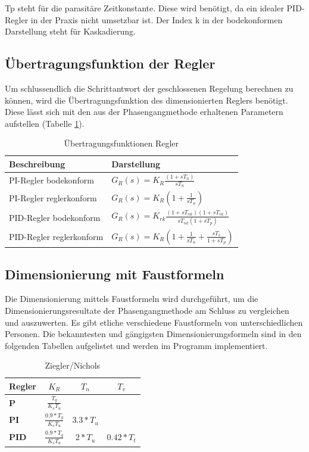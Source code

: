 Tp steht für die parasitäre Zeitkonstante. Diese wird benötigt, da ein idealer PID-Regler in der Praxis nicht umsetzbar ist. Der Index k in der bodekonformen Darstellung steht für Kaskadierung.

\subsection{Übertragungsfunktion der Regler}
Um schlussendlich die Schrittantwort der geschlossenen Regelung berechnen zu können, wird die Übertragungsfunktion des dimensionierten Reglers benötigt. Diese lässt sich mit den aus der Phasengangmethode erhaltenen Parametern aufstellen (Tabelle \ref{ufunkregler}).\newline
\begin{table}
\centering
\renewcommand*{\arraystretch}{1.7}
\begin{tabular}{|l|l|}
\hline 
\textbf{Beschreibung} & \textbf{Darstellung} \\ 
\hline
PI-Regler bodekonform & $G_R(s)=K_R\frac{(1+sT_n)}{sT_n}$ \\ 
\hline 
PI-Regler reglerkonform & $G_R(s)=K_R\left(1+\frac{1}{sT_n}\right)$ \\ 
\hline 
PID-Regler bodekonform & $G_R(s)=K_{rk}\frac{(1+sT_{nk})(1+sT_{vk})}{sT_{nk}(1+sT_p)}$ \\ 
\hline 
PID-Regler reglerkonform & $G_R(s)=K_R\left(1+\frac{1}{sT_n}+\frac{sT_v}{1+sT_p}\right)$ \\ 
\hline 
\end{tabular} 
\renewcommand*{\arraystretch}{1}
\caption{Übertragungsfunktionen Regler}
\label{ufunkregler}
\end{table}

\newpage
\subsection{Dimensionierung mit Faustformeln}
Die Dimensionierung mittels Faustformeln wird durchgeführt, um die Dimensionierungsresultate der Phasengangmethode am Schluss zu vergleichen und auszuwerten. Es gibt etliche verschiedene Faustformeln von unterschiedlichen Personen. Die bekanntesten und gängigsten Dimensionierungsformeln sind in den folgenden Tabellen aufgelistet und werden im Programm implementiert.\\

\begin{table}[h]
\centering
\renewcommand*{\arraystretch}{1.7}
\begin{tabular}{|l|c|c|c|}
\hline 
\textbf{Regler} & \textbf{$K_R$} & \textbf{$T_n$} & \textbf{$T_v$} \\ 
\hline 
\textbf{P} & $\frac{T_g}{K_sT_u}$ &  &  \\ 
\hline 
\textbf{PI} & $\frac{0.9*T_g}{K_sT_u}$ & $3.3*T_u$ &  \\ 
\hline 
\textbf{PID} & $\frac{0.9*T_g}{K_sT_u}$ & $2*T_u$ & $0.42*T_t$ \\ 
\hline 
\end{tabular} 
\renewcommand*{\arraystretch}{1}
\caption{Ziegler/Nichols}
\end{table}

